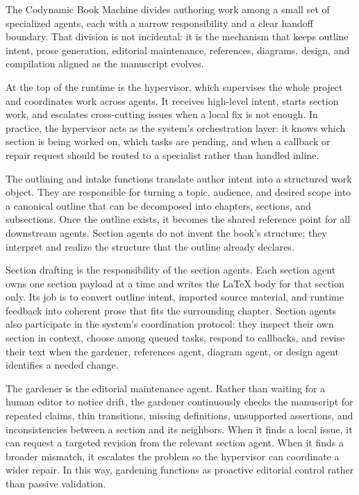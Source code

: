 The Codynamic Book Machine divides authoring work among a small set of specialized agents, each with a narrow responsibility and a clear handoff boundary. That division is not incidental: it is the mechanism that keeps outline intent, prose generation, editorial maintenance, references, diagrams, design, and compilation aligned as the manuscript evolves.

At the top of the runtime is the hypervisor, which supervises the whole project and coordinates work across agents. It receives high-level intent, starts section work, and escalates cross-cutting issues when a local fix is not enough. In practice, the hypervisor acts as the system's orchestration layer: it knows which section is being worked on, which tasks are pending, and when a callback or repair request should be routed to a specialist rather than handled inline.

The outlining and intake functions translate author intent into a structured work object. They are responsible for turning a topic, audience, and desired scope into a canonical outline that can be decomposed into chapters, sections, and subsections. Once the outline exists, it becomes the shared reference point for all downstream agents. Section agents do not invent the book's structure; they interpret and realize the structure that the outline already declares.

Section drafting is the responsibility of the section agents. Each section agent owns one section payload at a time and writes the \LaTeX{} body for that section only. Its job is to convert outline intent, imported source material, and runtime feedback into coherent prose that fits the surrounding chapter. Section agents also participate in the system's coordination protocol: they inspect their own section in context, choose among queued tasks, respond to callbacks, and revise their text when the gardener, references agent, diagram agent, or design agent identifies a needed change.

The gardener is the editorial maintenance agent. Rather than waiting for a human editor to notice drift, the gardener continuously checks the manuscript for repeated claims, thin transitions, missing definitions, unsupported assertions, and inconsistencies between a section and its neighbors. When it finds a local issue, it can request a targeted revision from the relevant section agent. When it finds a broader mismatch, it escalates the problem so the hypervisor can coordinate a wider repair. In this way, gardening functions as proactive editorial control rather than passive validation.

